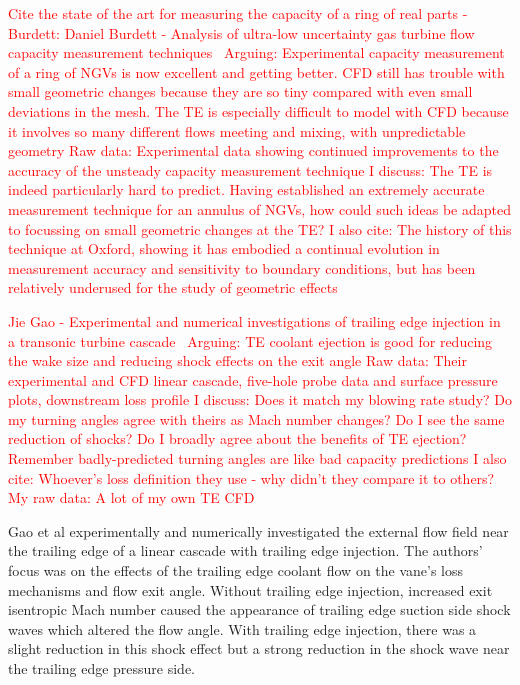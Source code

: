 \documentclass[a4paper, 11pt, oneside]{report}
\begin{document}
\textcolor{red}{Cite the state of the art for measuring the capacity of a ring of real parts - Burdett:}
	\textcolor{red}{Daniel Burdett - Analysis of ultra-low uncertainty gas turbine flow capacity measurement techniques~\cite{burdett_capacity_measurement}}
		\textcolor{red}{Arguing: Experimental capacity measurement of a ring of NGVs is now excellent and getting better. CFD still has trouble with small geometric changes because they are so tiny compared with even small deviations in the mesh. The TE is especially difficult to model with CFD because it involves so many different flows meeting and mixing, with unpredictable geometry}
		\textcolor{red}{Raw data: Experimental data showing continued improvements to the accuracy of the unsteady capacity measurement technique}
		\textcolor{red}{I discuss: The TE is indeed particularly hard to predict. Having established an extremely accurate measurement technique for an annulus of NGVs, how could such ideas be adapted to focussing on small geometric changes at the TE?}
		\textcolor{red}{I also cite: The history of this technique at Oxford, showing it has embodied a continual evolution in measurement accuracy and sensitivity to boundary conditions, but has been relatively underused for the study of geometric effects}
		
\textcolor{red}{Jie Gao - Experimental and numerical investigations of trailing edge injection in a transonic turbine cascade~\cite{gao_te}}
	\textcolor{red}{Arguing: TE coolant ejection is good for reducing the wake size and reducing shock effects on the exit angle}
	\textcolor{red}{Raw data: Their experimental and CFD linear cascade, five-hole probe data and surface pressure plots, downstream loss profile}
	\textcolor{red}{I discuss: Does it match my blowing rate study? Do my turning angles agree with theirs as Mach number changes? Do I see the same reduction of shocks? Do I broadly agree about the benefits of TE ejection? Remember badly-predicted turning angles are like bad capacity predictions}
	\textcolor{red}{I also cite: Whoever's loss definition they use - why didn't they compare it to others?}
	\textcolor{red}{My raw data: A lot of my own TE CFD}
	
Gao et al experimentally and numerically investigated the external flow field near the trailing edge of a linear cascade with trailing edge injection. The authors' focus was on the effects of the trailing edge coolant flow on the vane's loss mechanisms and flow exit angle. Without trailing edge injection, increased exit isentropic Mach number caused the appearance of trailing edge suction side shock waves which altered the flow angle. With trailing edge injection, there was a slight reduction in this shock effect but a strong reduction in the shock wave near the trailing edge pressure side.
		
\end{document}
